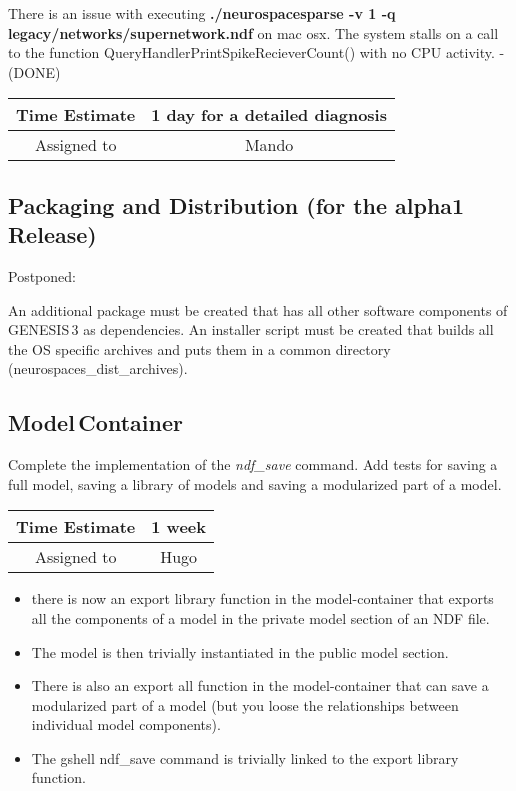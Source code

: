 \documentclass[12pt]{article}
\begin{document}
There is an issue with executing {\bf ./neurospacesparse -v 1 -q
  legacy/networks/supernetwork.ndf} on mac osx. The system stalls on a
call to the function QueryHandlerPrintSpikeRecieverCount() with no CPU
activity. - (DONE)

\begin{center}
  \vspace{5mm}
  \centering
  \begin{tabular}{|c|c|}
    \hline
    Time Estimate
    & 1 day for a detailed diagnosis \\
    \hline
    Assigned to
    & Mando \\
    \hline
  \end{tabular}
\end{center}


\subsection{Packaging and Distribution (for the alpha1 Release)}

Postponed:

An additional package must be created that has all other software
components of GENESIS\,3 as dependencies.  An installer script must
be created that builds all the OS specific archives and puts them in a
common directory (neurospaces\_dist\_archives).

\subsection{Model\,Container}
Complete the implementation of the {\it ndf\_save} command.  Add tests for
saving a full model, saving a library of models and saving a
modularized part of a model.

\begin{center}
  \vspace{5mm}
  \centering
  \begin{tabular}{|c|c|}
    \hline
    Time Estimate
    & 1 week \\
    \hline
    Assigned to
    & Hugo \\
    \hline
  \end{tabular}
\end{center}

\begin{itemize}
\item there is now an export library function in the model-container
  that exports all the components of a model in the private model
  section of an NDF file.
\item The model is then trivially instantiated in the public model
  section.
\item There is also an export all function in the model-container that
  can save a modularized part of a model (but you loose the
  relationships between individual model components).
\item The gshell ndf\_save command is trivially linked to the export
  library function.
\end{itemize}
\end{document}
